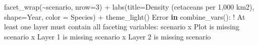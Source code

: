 \documentclass[
]{book}
\newenvironment{Shaded}{\begin{snugshade}}{\end{snugshade}}
\newcommand{\AttributeTok}[1]{\textcolor[rgb]{0.77,0.63,0.00}{#1}}
\newcommand{\ControlFlowTok}[1]{\textcolor[rgb]{0.13,0.29,0.53}{\textbf{#1}}}
\newcommand{\DecValTok}[1]{\textcolor[rgb]{0.00,0.00,0.81}{#1}}
\newcommand{\FunctionTok}[1]{\textcolor[rgb]{0.00,0.00,0.00}{#1}}
\newcommand{\NormalTok}[1]{#1}
\newcommand{\SpecialCharTok}[1]{\textcolor[rgb]{0.00,0.00,0.00}{#1}}
\newcommand{\StringTok}[1]{\textcolor[rgb]{0.31,0.60,0.02}{#1}}
\begin{document}
\begin{Shaded}
\begin{Highlighting}[]
  \FunctionTok{facet\_wrap}\NormalTok{(}\SpecialCharTok{\textasciitilde{}}\NormalTok{scenario, }\AttributeTok{nrow=}\DecValTok{3}\NormalTok{) }\SpecialCharTok{+} 
  \FunctionTok{labs}\NormalTok{(}\AttributeTok{title=}\StringTok{\textquotesingle{}Density (cetaceans per 1,000 km2)\textquotesingle{}}\NormalTok{, }
       \AttributeTok{shape=}\StringTok{\textquotesingle{}Year\textquotesingle{}}\NormalTok{, }\AttributeTok{color =} \StringTok{\textquotesingle{}Species\textquotesingle{}}\NormalTok{) }\SpecialCharTok{+} 
  \FunctionTok{theme\_light}\NormalTok{()}
\NormalTok{Error }\ControlFlowTok{in} \StringTok{\textasciigrave{}}\AttributeTok{combine\_vars()}\StringTok{\textasciigrave{}}\SpecialCharTok{:}
\SpecialCharTok{!}\NormalTok{ At least one layer must contain all faceting variables}\SpecialCharTok{:} \StringTok{\textasciigrave{}}\AttributeTok{scenario}\StringTok{\textasciigrave{}}
\NormalTok{x Plot is missing }\StringTok{\textasciigrave{}}\AttributeTok{scenario}\StringTok{\textasciigrave{}}
\NormalTok{x Layer }\DecValTok{1}\NormalTok{ is missing }\StringTok{\textasciigrave{}}\AttributeTok{scenario}\StringTok{\textasciigrave{}}
\NormalTok{x Layer }\DecValTok{2}\NormalTok{ is missing }\StringTok{\textasciigrave{}}\AttributeTok{scenario}\StringTok{\textasciigrave{}}
\end{Highlighting}
\end{Shaded}

~
\end{document}
